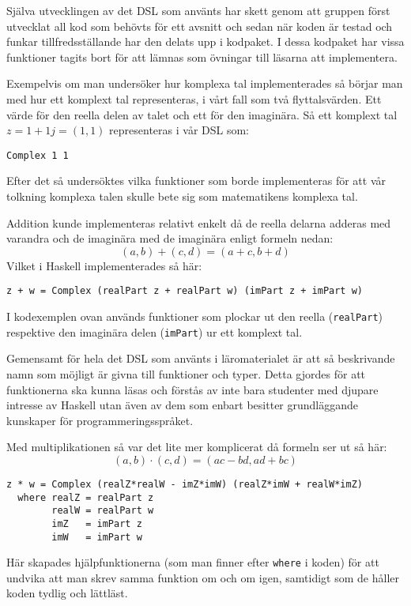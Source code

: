 \documentclass[]{article}
\begin{document}
Själva utvecklingen av det DSL som använts har skett genom att gruppen först
utvecklat all kod som behövts för ett avsnitt och sedan när koden är testad och
funkar tillfredsställande har den delats upp i kodpaket. I dessa kodpaket
har vissa funktioner tagits bort för att lämnas som övningar till läsarna att
implementera.

Exempelvis om man undersöker hur komplexa tal implementerades så börjar man med
hur ett komplext tal representeras, i vårt fall som två flyttalsvärden.
Ett värde för den reella delen av talet och ett för den imaginära.
Så ett komplext tal \(z = 1 + 1j = (1,1) \) representeras i vår DSL som:

\begin{verbatim}
Complex 1 1
\end{verbatim}

Efter det så undersöktes vilka funktioner som borde implementeras för
att vår tolkning komplexa talen skulle bete sig som matematikens komplexa tal.

Addition kunde implementeras relativt enkelt då de reella delarna adderas med
varandra och de imaginära med de imaginära enligt formeln nedan:
\[(a, b) + (c, d) = (a + c, b + d)\]
Vilket i Haskell implementerades så här:
\begin{verbatim}
z + w = Complex (realPart z + realPart w) (imPart z + imPart w)
\end{verbatim}

I kodexemplen ovan används funktioner som plockar ut den reella
(\texttt{realPart}) respektive den imaginära delen
(\texttt{imPart}) ur ett komplext tal.

Gemensamt för hela det DSL som använts i läromaterialet är att så beskrivande
namn som möjligt är givna till funktioner och typer.
Detta gjordes för att funktionerna ska kunna läsas och förstås av inte bara
studenter med djupare intresse av Haskell utan även av dem som enbart besitter
grundläggande kunskaper för programmeringsspråket.

Med multiplikationen så var det lite mer komplicerat då formeln ser ut så här:
 \[(a, b) \cdot (c, d) = (ac - bd, ad + bc) \]

\begin{verbatim}
z * w = Complex (realZ*realW - imZ*imW) (realZ*imW + realW*imZ)
  where realZ = realPart z
        realW = realPart w
        imZ   = imPart z
        imW   = imPart w
\end{verbatim}

Här skapades hjälpfunktionerna (som man finner efter \texttt{where}
i koden) för att undvika att man skrev samma funktion om och om igen,
samtidigt som de håller koden tydlig och lättläst.
\end{document}
